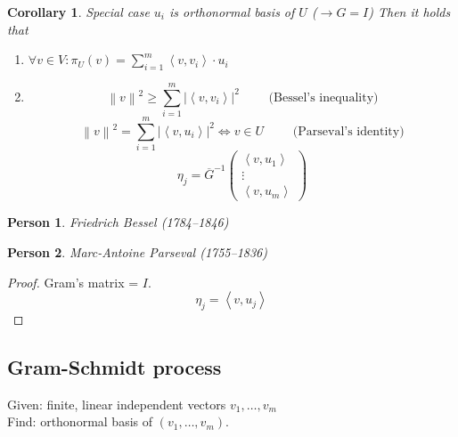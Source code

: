 \documentclass{article}
\newcounter{lecref}[section]
\numberwithin{lecref}{section}
\newtheorem{corollary}[lecref]{Corollary}
\newtheorem*{person}{Person}
\newcommand{\ip}[2]{\left\langle#1,#2\right\rangle} %
\newcommand{\norm}[1]{\left\|#1\right\|}
\newcommand{\card}[1]{\left|#1\right|}
\begin{document}
\begin{corollary} %
  \label{ONRcor}
  Special case $u_i$ is orthonormal basis of $U$ ($\rightarrow G = I$)
  Then it holds that
  \begin{enumerate}
    \item $\forall v \in V: \pi_U(v) = \sum_{i=1}^m \ip{v}{v_i} \cdot u_i$
    \item
      \[ \norm{v}^2 \geq \sum_{i=1}^m \card{\ip{v}{v_i}}^2 \qquad \text{ (Bessel's inequality)} \]
      \[ \norm{v}^2 = \sum_{i=1}^m \card{\ip{v}{u_i}}^2 \iff v \in U \qquad \text{ (Parseval's identity)} \]
      \[ \eta_j = \overline{G}^{-1}\begin{pmatrix} \ip{v}{u_1} \\ \vdots \\ \ip{v}{u_m} \end{pmatrix} \]
  \end{enumerate}
\end{corollary}

\begin{person}
  Friedrich Bessel (1784--1846)
\end{person}
\begin{person}
  Marc-Antoine Parseval (1755--1836)
\end{person}

\begin{proof}
  Gram's matrix = $I$.
  \[ \eta_j = \ip{v}{u_j} \]
\end{proof}

\subsection{Gram-Schmidt process}

Given: finite, linear independent vectors $v_1, \dots, v_m$ \\
Find: orthonormal basis of $(v_1, \dots, v_m)$.
\end{document}
